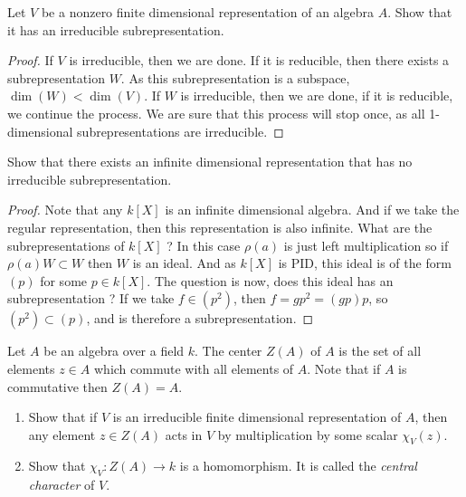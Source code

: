 \begin{thm}
Let \(V\) be a nonzero finite dimensional representation of an algebra \(A\). Show that it has an irreducible subrepresentation.
\end{thm}

\begin{proof}
If $V$ is irreducible, then we are done. If it is reducible, then there exists a subrepresentation $W$. As this subrepresentation is a subspace, $\dim(W) < \dim (V)$. If $W$ is irreducible, then we are done, if it is reducible, we continue the process. We are sure that this process will stop once, as all 1-dimensional subrepresentations are irreducible.
\end{proof}

\begin{thm}
Show that there exists an infinite dimensional representation that has no irreducible subrepresentation.
\end{thm}

\begin{proof}
Note that any $k[X]$ is an infinite dimensional algebra. And if we take the regular representation, then this representation is also infinite. What are the subrepresentations of $k[X]$ ? In this case $\rho(a)$ is just left multiplication so if $\rho(a)W \subset W$ then $W$ is an ideal. And as $k[X]$ is PID, this ideal is of the form $(p)$ for some $p \in k[X]$. The question is now, does this ideal has an subrepresentation ? If we take $f \in (p^2)$, then $f= gp^2= (gp)p$, so $(p^2)\subset (p)$, and is therefore a subrepresentation. 
\end{proof}

\begin{defn}
Let \(A\) be an algebra over a field \(k\). The center \(Z(A)\) of \(A\) is the set of all elements \(z\in A\) which commute with all elements of \(A\). Note that if \(A\) is commutative then \(Z(A)=A\).
\end{defn}

\begin{thm} 
\begin{enumerate}
  \item Show that if \(V\) is an irreducible finite dimensional representation of \(A\), then any element \(z\in Z(A)\) acts in \(V\) by multiplication by some scalar \(\chi _{V} (z)\).
  \item Show that \(\chi _{V} :Z(A)\rightarrow k\) is a homomorphism. It is called the \emph{central character} of \(V\).
\end{enumerate}

\end{thm}


